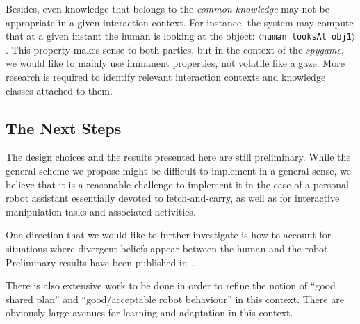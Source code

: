 \documentclass[preprint,3p,times]{elsarticle}
\newcommand{\stmt}[1]{{\footnotesize\tt$\langle$#1\relax$\rangle$}}
\begin{document}
Besides, even knowledge that belongs to the \emph{common knowledge} may not be
appropriate in a given interaction context. For instance, the system may
compute that at a given instant the human is looking at the object: \stmt{human
looksAt obj1}. This property makes sense to both parties, but in the context of
the \emph{spygame}, we would like to mainly use immanent properties, not
volatile like a gaze. More research is required to identify relevant
interaction contexts and knowledge classes attached to them.


\subsection{The Next Steps}


The design choices and the results presented here are still preliminary.
While the general scheme we propose might be difficult to implement in
a general sense, we believe that it is a reasonable challenge to
implement it in the case of a personal robot assistant essentially
devoted to fetch-and-carry, as well as for interactive manipulation
tasks and associated activities.

One direction that we would like to further investigate is how to account for
situations where divergent beliefs appear between the human and the robot.
Preliminary results have been published in~\cite{warnier2012when}.

There is also extensive work to be done in order to refine the notion of ``good
shared plan'' and ``good/acceptable robot behaviour'' in this context. There are
obviously large avenues for learning and adaptation in this context.
\end{document}
